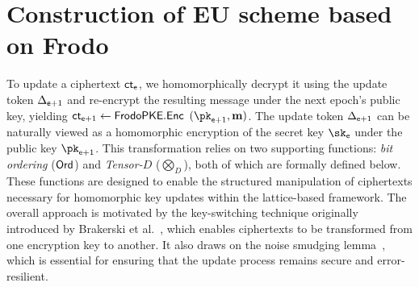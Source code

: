 \documentclass{fundam}
\begin{document}
\section{Construction of  EU scheme based on Frodo}
To update a ciphertext $\mathsf{ct}_{\mathsf{e}}$, we homomorphically decrypt it using the update token $\Delta_{\mathsf{e}+1}$ and re-encrypt the resulting message under the next epoch’s public key, yielding $\mathsf{ct}_{\mathsf{e}+1} \gets \mathsf{FrodoPKE.Enc}$ $(\pk_{\epoch+1}, \m)$. The update token $\Delta_{\mathsf{e}+1}$ can be naturally viewed as a homomorphic encryption of the secret key $\sk_{\epoch}$ under the public key $\pk_{\epoch+1}$.
%
This transformation relies on two supporting functions: \emph{bit ordering} ($\mathsf{Ord}$) and \emph{Tensor-$D$} ($\bigotimes_{D}$), both of which are formally defined below. These functions are designed to enable the structured manipulation of ciphertexts necessary for homomorphic key updates within the lattice-based framework.
%
The overall approach is motivated by the key-switching technique originally introduced by Brakerski et al.~\cite{brakerski2011fully, brakerski2014leveled, brakerski2014efficient}, which enables ciphertexts to be transformed from one encryption key to another. It also draws on the noise smudging lemma~\cite{asharov2012multiparty, nishimaki2022direction}, which is essential for ensuring that the update process remains secure and error-resilient.
\end{document}
